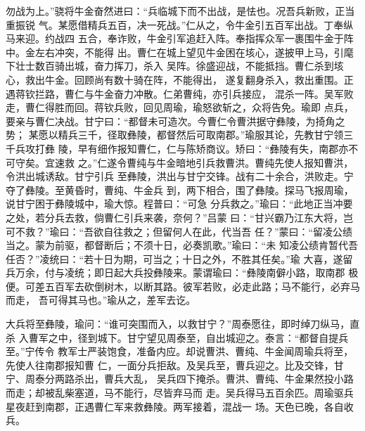 勿战为上。”骁将牛金奋然进曰：“兵临城下而不出战，是怯也。况吾兵新败，正当重振锐
气。某愿借精兵五百，决一死战。”仁从之，令牛金引五百军出战。丁奉纵马来迎。约战四
五合，奉诈败，牛金引军追赶入阵。奉指挥众军一裹围牛金于阵中。金左右冲突，不能得
出。曹仁在城上望见牛金困在垓心，遂披甲上马，引麾下壮士数百骑出城，奋力挥刀，杀入
吴阵。徐盛迎战，不能抵挡。曹仁杀到垓心，救出牛金。回顾尚有数十骑在阵，不能得出，
遂复翻身杀入，救出重围。正遇蒋钦拦路，曹仁与牛金奋力冲散。仁弟曹纯，亦引兵接应，
混杀一阵。吴军败走，曹仁得胜而回。蒋钦兵败，回见周瑜，瑜怒欲斩之，众将告免。瑜即
点兵，要亲与曹仁决战。甘宁曰：“都督未可造次。今曹仁令曹洪据守彝陵，为掎角之势；
某愿以精兵三千，径取彝陵，都督然后可取南郡。”瑜服其论，先教甘宁领三千兵攻打彝
陵，早有细作报知曹仁，仁与陈矫商议。矫曰：“彝陵有失，南郡亦不可守矣。宜速救
之。”仁遂令曹纯与牛金暗地引兵救曹洪。曹纯先使人报知曹洪，令洪出城诱敌。甘宁引兵
至彝陵，洪出与甘宁交锋。战有二十余合，洪败走。宁夺了彝陵。至黄昏时，曹纯、牛金兵
到，两下相合，围了彝陵。探马飞报周瑜，说甘宁困于彝陵城中，瑜大惊。程普曰：“可急
分兵救之。”瑜曰：“此地正当冲要之处，若分兵去救，倘曹仁引兵来袭，奈何？”吕蒙
曰：“甘兴霸乃江东大将，岂可不救？”瑜曰：“吾欲自往救之；但留何人在此，代当吾
任？”蒙曰：“留凌公绩当之。蒙为前驱，都督断后；不须十日，必奏凯歌。”瑜曰：“未
知凌公绩肯暂代吾任否？”凌统曰：“若十日为期，可当之；十日之外，不胜其任矣。”瑜
大喜，遂留兵万余，付与凌统；即日起大兵投彝陵来。蒙谓瑜曰：“彝陵南僻小路，取南郡
极便。可差五百军去砍倒树木，以断其路。彼军若败，必走此路；马不能行，必弃马而走，
吾可得其马也。”瑜从之，差军去讫。

大兵将至彝陵，瑜问：“谁可突围而入，以救甘宁？”周泰愿往，即时绰刀纵马，直杀
入曹军之中，径到城下。甘宁望见周泰至，自出城迎之。泰言：“都督自提兵至。”宁传令
教军士严装饱食，准备内应。却说曹洪、曹纯、牛金闻周瑜兵将至，先使人往南郡报知曹
仁，一面分兵拒敌。及吴兵至，曹兵迎之。比及交锋，甘宁、周泰分两路杀出，曹兵大乱，
吴兵四下掩杀。曹洪、曹纯、牛金果然投小路而走；却被乱柴塞道，马不能行，尽皆弃马而
走。吴兵得马五百余匹。周瑜驱兵星夜赶到南郡，正遇曹仁军来救彝陵。两军接着，混战一
场。天色已晚，各自收兵。

